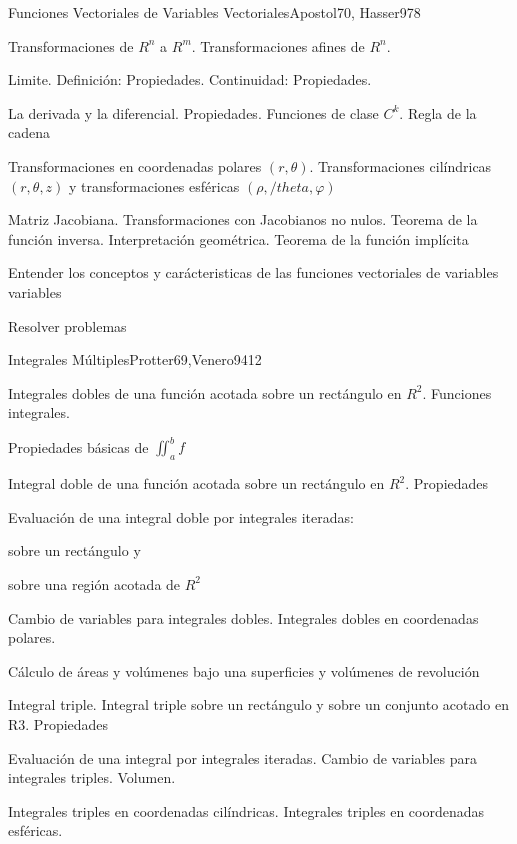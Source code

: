 \begin{syllabus}
\begin{unit}{Funciones Vectoriales de Variables Vectoriales}{Apostol70, Hasser97}{8}
   \begin{topics}
         \item  Transformaciones de $R^n$ a $R^m$. Transformaciones afines de $R^n$.
	 \item  Limite. Definición: Propiedades. Continuidad: Propiedades.
         \item  La derivada y la diferencial. Propiedades. Funciones de clase $C^k$. Regla de la cadena
	 \item  Transformaciones en coordenadas polares $(r,\theta)$. Transformaciones cilíndricas  $(r,\theta,z)$ y transformaciones esféricas $(\rho,/theta,\varphi)$
         \item  Matriz Jacobiana. Transformaciones con Jacobianos no nulos. Teorema de la función inversa. Interpretación geométrica. Teorema de la función implícita
   \end{topics}

   \begin{learningoutcomes}
         \item  Entender los conceptos y carácteristicas de las funciones vectoriales de variables variables
         \item  Resolver problemas
   \end{learningoutcomes}
\end{unit}

\begin{unit}{Integrales Múltiples}{Protter69,Venero94}{12}
   \begin{topics}
         \item  Integrales dobles de una función acotada sobre un rectángulo en $R^2$. Funciones integrales.
	 \item  Propiedades básicas de $\iint_{a}^{b} f$
         \item  Integral doble de una función acotada sobre un rectángulo en $R^2$. Propiedades
	 \item  Evaluación de una integral doble por integrales iteradas:
	\begin{subtopicos}
		\item sobre un rectángulo y
		\item sobre una región acotada de $R^2$
	\end{subtopicos}
         \item  Cambio de variables para integrales dobles. Integrales dobles en coordenadas polares.
	 \item  Cálculo de áreas y volúmenes bajo una superficies y volúmenes de revolución
         \item  Integral triple. Integral triple sobre un rectángulo y sobre un conjunto acotado en R3. Propiedades
	\item Evaluación de una integral por integrales iteradas. Cambio de variables para integrales triples. Volumen.
	\item Integrales triples en coordenadas cilíndricas. Integrales triples en coordenadas esféricas.
   \end{topics}


\end{unit}
\end{syllabus}
